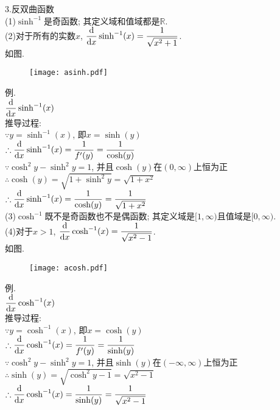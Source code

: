 3.反双曲函数\\
(1)$\sinh^{-1}$是奇函数; 其定义域和值域都是$\mathbb{R}$.\\[1ex]
(2)对于所有的实数$x$, $\displaystyle\frac{\mathop{}\!\mathrm{d} }{\mathop{}\!\mathrm{d} x}\sinh^{-1}(x)=\frac{1}{\sqrt{x^2+1}}$.\\[1ex]
如图.
\begin{figure}[H]
\centering
	\texttt{[image: asinh.pdf]}
\end{figure}
例.\\
\phantom{例}$\displaystyle\frac{\mathop{}\!\mathrm{d}}{\mathop{}\!\mathrm{d} x}\sinh^{-1}(x)$\\
推导过程:\\
$\displaystyle\because y=\sinh^{-1}(x)$, 即$x=\sinh(y)$\\
$\displaystyle\therefore\frac{\mathop{}\!\mathrm{d}}{\mathop{}\!\mathrm{d} x}\sinh^{-1}(x)=\frac{1}{f'(y)}=\frac{1}{\cosh(y)}$\\
$\displaystyle\because\cosh^2y-\sinh^2y=1$, 并且$\cosh(y)$在$(0,\infty)$上恒为正\\
$\displaystyle\therefore\cosh(y)=\sqrt{1+\sinh^2y}=\sqrt{1+x^2}$\\
$\displaystyle\therefore\frac{\mathop{}\!\mathrm{d}}{\mathop{}\!\mathrm{d} x}\sinh^{-1}(x)=\frac{1}{\cosh(y)}=\frac{1}{\sqrt{1+x^2}}$\\[1ex]

(3)$\cosh^{-1}$既不是奇函数也不是偶函数; 其定义域是$[1,\infty)$且值域是$[0,\infty)$.\\[1ex]
(4)对于$x>1$, $\displaystyle\frac{\mathop{}\!\mathrm{d} }{\mathop{}\!\mathrm{d} x}\cosh^{-1}(x)=\frac{1}{\sqrt{x^2-1}}$.\\[1ex]
如图.
\begin{figure}[H]
\centering
	\texttt{[image: acosh.pdf]}
\end{figure}
例.\\
\phantom{例}$\displaystyle\frac{\mathop{}\!\mathrm{d}}{\mathop{}\!\mathrm{d} x}\cosh^{-1}(x)$\\
推导过程:\\
$\displaystyle\because y=\cosh^{-1}(x)$, 即$x=\cosh(y)$\\
$\displaystyle\therefore\frac{\mathop{}\!\mathrm{d}}{\mathop{}\!\mathrm{d} x}\cosh^{-1}(x)=\frac{1}{f'(y)}=\frac{1}{\sinh(y)}$\\
$\displaystyle\because\cosh^2y-\sinh^2y=1$, 并且$\sinh(y)$在$(-\infty,\infty)$上恒为正\\
$\displaystyle\therefore\sinh(y)=\sqrt{\cosh^2y-1}=\sqrt{x^2-1}$\\
$\displaystyle\therefore\frac{\mathop{}\!\mathrm{d}}{\mathop{}\!\mathrm{d} x}\cosh^{-1}(x)=\frac{1}{\sinh(y)}=\frac{1}{\sqrt{x^2-1}}$

